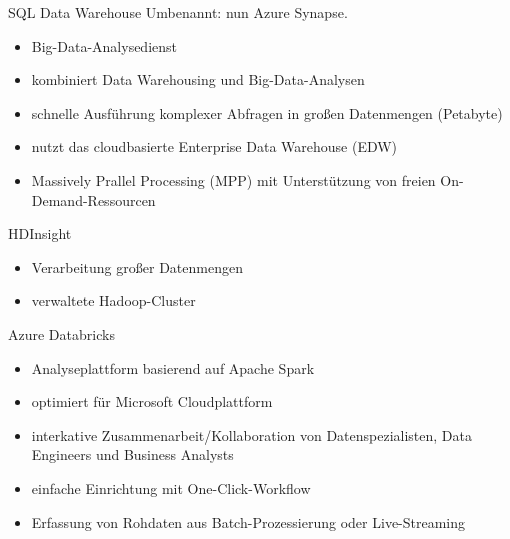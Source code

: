 \begin{flashcard}[Describe]{SQL Data Warehouse}
    Umbenannt: nun Azure Synapse.

    \begin{itemize}
        \item Big-Data-Analysedienst
        \item kombiniert Data Warehousing und Big-Data-Analysen
        \item schnelle Ausführung komplexer Abfragen in großen Datenmengen (Petabyte)
        \item nutzt das cloudbasierte Enterprise Data Warehouse (EDW)
        \item Massively Prallel Processing (MPP) mit Unterstützung von freien On-Demand-Ressourcen
    \end{itemize}
\end{flashcard}

\begin{flashcard}[Describe]{HDInsight}
    \begin{itemize}
        \item Verarbeitung großer Datenmengen
        \item verwaltete Hadoop-Cluster
    \end{itemize}
\end{flashcard}

\begin{flashcard}[Describe]{Azure Databricks}
    \begin{itemize}
        \item Analyseplattform basierend auf Apache Spark
        \item optimiert für Microsoft Cloudplattform
        \item interkative Zusammenarbeit/Kollaboration von Datenspezialisten, Data Engineers und Business Analysts
        \item einfache Einrichtung mit One-Click-Workflow
        \item Erfassung von Rohdaten aus Batch-Prozessierung oder Live-Streaming
    \end{itemize}
\end{flashcard}

